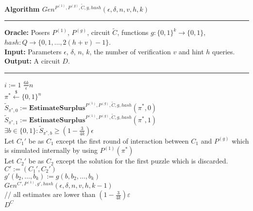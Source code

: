 \begin{codeblock}
  \textbf{Algorithm $Gen^{P^{(1)}, P^{(g)}, \widetilde{C}, g, hash}(\epsilon, \delta, n, v, h, k)$}
  \medskip
  \hrule
  \medskip
  \textbf{Oracle:} Posers $P^{(1)}$, $P^{(g)}$, circuit $\widetilde{C}$, functions $g: \{0,1\}^{k} \rightarrow \{0,1\}$, \\
  \IndII  $hash:Q \rightarrow \{0,1, \dots, 2(h + v) - 1\}$. \\
  \textbf{Input:}  Parameters $\epsilon$, $\delta$, $n$, $k$, the number of verification $v$ and hint $h$ queries.\\
  \textbf{Output:} A circuit $D$.
  \medskip\hrule\medskip
  \For $i:=1$ \To $\frac{6k}{\epsilon}n$ \Do \\
  \IndI $\pi^* \xleftarrow{\$} \{0,1\}^{n}$\\
  \IndI $\widetilde{S}_{\pi^*,0} := \textbf{EstimateSurplus}^{P^{(1)}, P^{(g)}, \widetilde{C}, g, hash}(\pi^*, 0)$\\
  \IndI $\widetilde{S}_{\pi^*,1} := \textbf{EstimateSurplus}^{P^{(1)}, P^{(g)}, \widetilde{C}, g, hash}(\pi^*, 1)$\\
  \IndI \If $ \exists b \in \{0,1\}: \widetilde{S}_{\pi^*,b} \geq (1 - \frac{3}{4k}) \epsilon$ \then \\
  \IndII Let $C_1'$ be as $C_1$ except the first round of interaction between $C_1$ and $P^{(g)}$ which \\
  \IndII is simulated internally by using $P^{(1)}(\pi^*)$\\
  \IndII Let $C_2'$ be as $C_2$ except the solution for the first puzzle which is discarded. \\
  \IndII $C' := (C_1', C_2')$ \\
  \IndII $g'(b_2, \dots, b_k) := g(b, b_2, \dots, b_k)$\\
  \IndII\return $Gen^{C', P^{(1)}, g', hash}(\epsilon, \delta, n, v, h, k-1)$ \\
  // all estimates are lower than $(1-\frac{3}{4k})\varepsilon$\\
  \return $D^{C}$
\end{codeblock}

